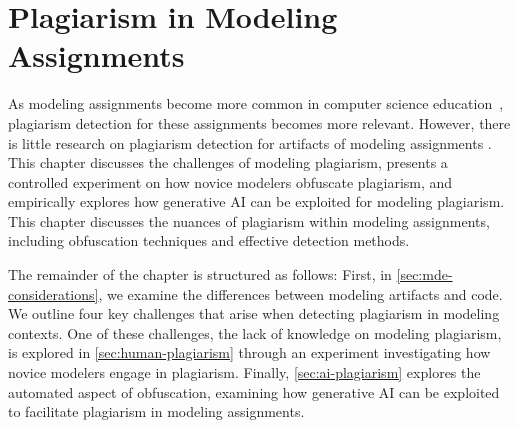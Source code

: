 \chapter{Plagiarism in Modeling Assignments}\label{cha:mde1}


As modeling assignments become more common in computer science education~\cite{Ciccozzi2018, Brambilla2017}, plagiarism detection for these assignments becomes more relevant. However, there is little research on plagiarism detection for artifacts of modeling assignments \cite{Martinez2020}.
This chapter discusses the challenges of modeling plagiarism, presents a controlled experiment on how novice modelers obfuscate plagiarism, and empirically explores how generative AI can be exploited for modeling plagiarism.
This chapter discusses the nuances of plagiarism within modeling assignments, including obfuscation techniques and effective detection methods.

The remainder of the chapter is structured as follows:
First, in \autoref{sec:mde-considerations}, we examine the differences between modeling artifacts and code. We outline four key challenges that arise when detecting plagiarism in modeling contexts.
One of these challenges, the lack of knowledge on modeling plagiarism, is explored in \autoref{sec:human-plagiarism} through an experiment investigating how novice modelers engage in plagiarism.
Finally, \autoref{sec:ai-plagiarism} explores the automated aspect of obfuscation, examining how generative AI can be exploited to facilitate plagiarism in modeling assignments.








